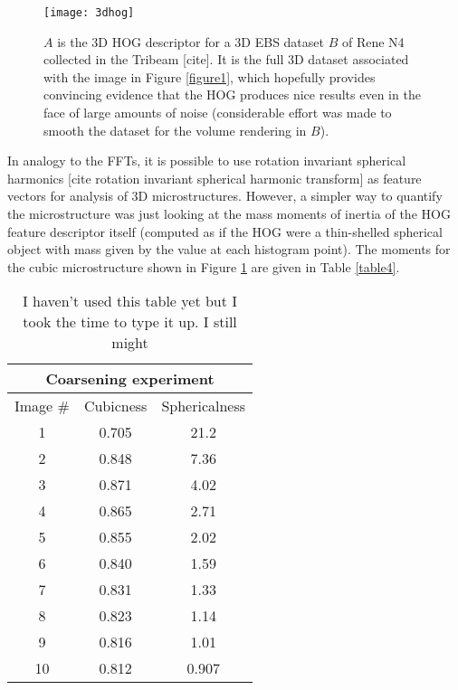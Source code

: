 \documentclass[review]{elsarticle}
\begin{document}
	\begin{figure}[!ht]
  		\centering
    	\texttt{[image: 3dhog]}
  		\caption{ $A$ is the 3D HOG descriptor for a 3D EBS dataset $B$ of Rene N4 collected in the Tribeam [cite]. It is the full 3D dataset associated with the image in Figure \ref{figure1}, which hopefully provides convincing evidence that the HOG produces nice results even in the face of large amounts of noise (considerable effort was made to smooth the dataset for the volume rendering in $B$). }
  		\label{figure4}
	\end{figure}

	In analogy to the FFTs, it is possible to use rotation invariant spherical harmonics [cite rotation invariant spherical harmonic transform] as feature vectors for analysis of 3D microstructures. However, a simpler way to quantify the microstructure was just looking at the mass moments of inertia of the HOG feature descriptor itself (computed as if the HOG were a thin-shelled spherical object with mass given by the value at each histogram point). The moments for the cubic microstructure shown in Figure \ref{figure4} are given in Table \ref{table4}.
	
    \begin{table}[h]
      \begin{center}
      \begin{tabular}{ c | c | c }
        \multicolumn{3}{c}{Coarsening experiment} \\
        \hline
        Image \# & Cubicness & Sphericalness \\
        \hline
        1 & 0.705 & 21.2 \\
        2 & 0.848 & 7.36 \\
        3 & 0.871 & 4.02 \\
        4 & 0.865 & 2.71 \\
        5 & 0.855 & 2.02 \\
        6 & 0.840 & 1.59 \\
        7 & 0.831 & 1.33 \\
        8 & 0.823 & 1.14 \\
        9 & 0.816 & 1.01 \\
        10 & 0.812 & 0.907 \\
        \hline
      \end{tabular}
	  \label{table2}
	  \caption{I haven't used this table yet but I took the time to type it up. I still might }
	  \end{center}
  	\end{table}
\end{document}
